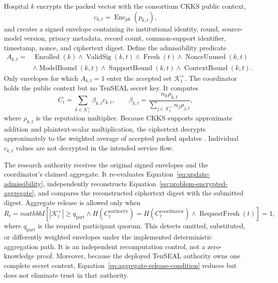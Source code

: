 Hospital $k$ encrypts the packed vector with the consortium CKKS public context,
\begin{equation}
    c_{k,t}=\operatorname{Enc}_{pk}(p_{k,t}),
    \label{eq:encrypted-packed-update}
\end{equation}
and creates a signed envelope containing its institutional identity, round, source-model version, privacy metadata, record count, common-support identifier, timestamp, nonce, and ciphertext digest. Define the admissibility predicate
\begin{align}
    A_{k,t}={}&\operatorname{Enrolled}(k)\land
    \operatorname{ValidSig}(k,t)\land
    \operatorname{Fresh}(t)\land
    \operatorname{NonceUnused}(k,t) \nonumber\\
    &\land\operatorname{ModelBound}(k,t)\land
    \operatorname{SupportBound}(k,t)\land
    \operatorname{ContextBound}(k,t).
    \label{eq:update-admissibility}
\end{align}
Only envelopes for which $A_{k,t}=1$ enter the accepted set $\mathcal{K}_t^{+}$. The coordinator holds the public context but no TenSEAL secret key. It computes
\begin{equation}
    C_t=\sum_{k\in\mathcal{K}_t^{+}}
    \beta_{k,t}c_{k,t},
    \qquad
    \beta_{k,t}=\frac{n_k\rho_{k,t}}
    {\sum_{j\in\mathcal{K}_t^{+}}n_j\rho_{j,t}},
    \label{eq:problem-encrypted-aggregate}
\end{equation}
where $\rho_{k,t}$ is the reputation multiplier. Because CKKS supports approximate addition and plaintext-scalar multiplication, the ciphertext decrypts approximately to the weighted average of accepted packed updates \cite{cheon2017homomorphic}. Individual $c_{k,t}$ values are not decrypted in the intended service flow.

The research authority receives the original signed envelopes and the coordinator's claimed aggregate. It re-evaluates Equation~\ref{eq:update-admissibility}, independently reconstructs Equation~\ref{eq:problem-encrypted-aggregate}, and compares the reconstructed ciphertext digest with the submitted digest. Aggregate release is allowed only when
\begin{equation}
    R_t=mathbb{I}\!\left[
        |\mathcal{K}_t^{+}|\geq q_{\mathrm{part}}
        \land H(C_t^{\mathrm{authority}})=H(C_t^{\mathrm{coordinator}})
        \land \operatorname{RequestFresh}(t)
    \right]=1,
    \label{eq:aggregate-release-condition}
\end{equation}
where $q_{\mathrm{part}}$ is the required participant quorum. This detects omitted, substituted, or differently weighted envelopes under the implemented deterministic aggregation path. It is an independent recomputation control, not a zero-knowledge proof. Moreover, because the deployed TenSEAL authority owns one complete secret context, Equation~\ref{eq:aggregate-release-condition} reduces but does not eliminate trust in that authority.


